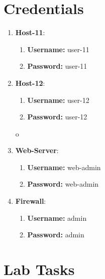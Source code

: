 \section{Credentials}
\begin{enumerate}
	\item \textbf{Host-11}:
	\begin{enumerate}
		\item \textbf{Username:} user-11
		\item \textbf{Password:} user-11
	\end{enumerate}
	\item \textbf{Host-12}:
	\begin{enumerate}
		\item \textbf{Username:} user-12
		\item \textbf{Password:} user-12
	\end{enumerate}o
	\item \textbf{Web-Server}:
	\begin{enumerate}
		\item \textbf{Username:} web-admin
		\item \textbf{Password:} web-admin
	\end{enumerate}
	\item \textbf{Firewall}:
	\begin{enumerate}
		\item \textbf{Username:} admin
		\item \textbf{Password:} admin
	\end{enumerate}
\end{enumerate}

\section{Lab Tasks}

